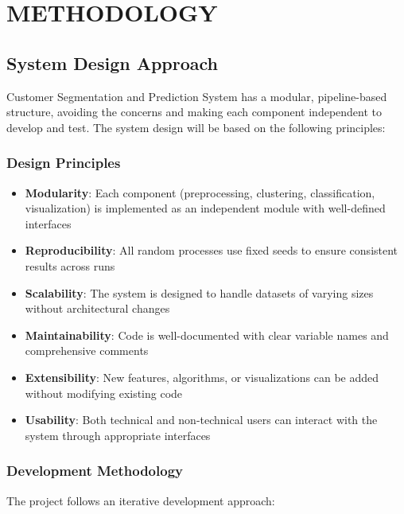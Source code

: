 \documentclass[12pt,a4paper]{report}
\begin{document}
\chapter{METHODOLOGY}

\section{System Design Approach}
\noindent Customer Segmentation and Prediction System has a modular, pipeline-based structure, avoiding the concerns and making each component independent to develop and test. The system design will be based on the following principles:

\subsection{Design Principles}
\begin{itemize}
    \item \textbf{Modularity}: Each component (preprocessing, clustering, classification, visualization) is implemented as an independent module with well-defined interfaces
    \item \textbf{Reproducibility}: All random processes use fixed seeds to ensure consistent results across runs
    \item \textbf{Scalability}: The system is designed to handle datasets of varying sizes without architectural changes
    \item \textbf{Maintainability}: Code is well-documented with clear variable names and comprehensive comments
    \item \textbf{Extensibility}: New features, algorithms, or visualizations can be added without modifying existing code
    \item \textbf{Usability}: Both technical and non-technical users can interact with the system through appropriate interfaces
\end{itemize}

\subsection{Development Methodology}
\noindent The project follows an iterative development approach:
\end{document}
